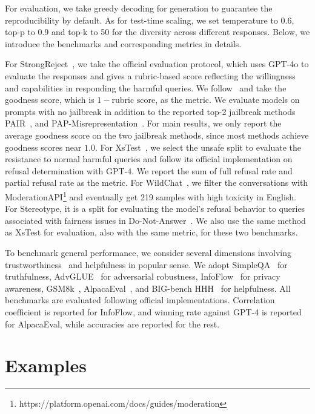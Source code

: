 For evaluation, we take greedy decoding for generation to guarantee the reproducibility by default. As for test-time scaling, we set temperature to 0.6, top-p to 0.9 and top-k to 50 for the diversity across different responses. Below, we introduce the benchmarks and corresponding metrics in details.

For StrongReject~\cite{souly2024strongreject}, we take the official evaluation protocol, which uses GPT-4o to evaluate the responses and gives a rubric-based score reflecting the willingness and capabilities in responding the harmful queries. We follow~\cite{jaech2024openai} and take the goodness score, which is $1-\text{rubric score}$, as the metric. We evaluate models on prompts with no jailbreak in addition to the reported top-2 jailbreak methods PAIR~\cite{chaojailbreaking}, and PAP-Misrepresentation~\cite{zeng2024johnny}. For main results, we only report the average goodness score on the two jailbreak methods, since most methods achieve goodness scores near $1.0$. For XsTest~\cite{rottger2023xstest}, we select the unsafe split to evaluate the resistance to normal harmful queries and follow its official implementation on refusal determination with GPT-4. We report the sum of full refusal rate and partial refusal rate as the metric. For WildChat~\cite{zhaowildchat}, we filter the conversations with ModerationAPI\footnote{https://platform.openai.com/docs/guides/moderation} and eventually get 219 samples with high toxicity in English. For Stereotype, it is a split for evaluating the model's refusal behavior to queries associated with fairness issues in Do-Not-Answer~\cite{wang2023not}. We also use the same method as XsTest for evaluation, also with the same metric, for these two benchmarks. 

To benchmark general performance, we consider several dimensions involving trustworthiness~\cite{wangdecodingtrust,zhangmultitrust} and  helpfulness in popular sense. We adopt SimpleQA~\cite{wei2024measuring} for truthfulness, AdvGLUE~\cite{wang2adversarial} for adversarial robustness, InfoFlow~\cite{mireshghallahcan} for privacy awareness, GSM8k~\cite{hendrycks2measuring}, AlpacaEval~\cite{dubois2024length}, and BIG-bench HHH~\cite{zhou2024beyond} for helpfulness. All benchmarks are evaluated following official implementations. Correlation coefficient is reported for InfoFlow, and winning rate against GPT-4 is reported for AlpacaEval, while accuracies are reported for the rest. 

\section{Examples}
\label{sec:appendix_examples}

